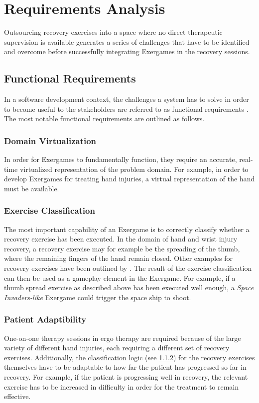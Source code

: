 \section{Requirements Analysis}
\label{sec:reqanalysis}
Outsourcing recovery exercises into a space where no direct therapeutic supervision is available generates a series of challenges that have to be identified and overcome before successfully integrating Exergames in the recovery sessions. 

\subsection{Functional Requirements}
In a software development context, the challenges a system has to solve in order to become useful to the stakeholders are referred to as functional requirements \cite{SystemRequirementsArmyFR}.  The most notable functional requirements are outlined as follows.

\subsubsection{Domain Virtualization}
In order for Exergames to fundamentally function, they require an accurate, real-time virtualized representation of the problem domain. For example, in order to develop Exergames for treating hand injuries, a virtual representation of the hand must be available.

\subsubsection{Exercise Classification}
\label{sec:exercise-classification}
The most important capability of an Exergame is to correctly classify whether a recovery exercise has been executed. In the domain of hand and wrist injury recovery, a recovery exercise may for example be the spreading of the thumb, where the remaining fingers of the hand remain closed. Other examples for recovery exercises have been outlined by \cite{StudiArbeitVolzBaumotte}. The result of the exercise classification can then be used as a gameplay element in the Exergame. For example, if a thumb spread exercise as described above has been executed well enough, a \emph{Space Invaders-like} Exergame could trigger the space ship to shoot.

\subsubsection{Patient Adaptibility}
One-on-one therapy sessions in ergo therapy are required because of the large variety of different hand injuries, each requiring a different set of recovery exercises. Additionally, the classification logic (see \ref{sec:exercise-classification}) for the recovery exercises themselves have to be adaptable to how far the patient has progressed so far in recovery. For example, if the patient is progressing well in recovery, the relevant exercise has to be increased in difficulty in order for the treatment to remain effective.

